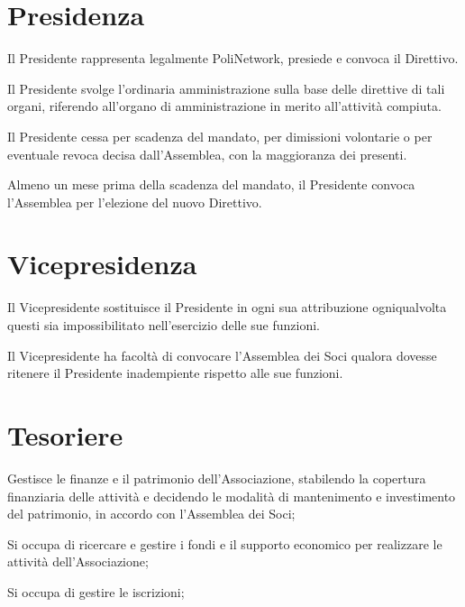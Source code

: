 \documentclass[legalpaper, 11pt]{exam}
\let\tempone\enumerate
\let\temptwo\endenumerate
\renewenvironment{enumerate}{\tempone\addtolength{\itemsep}{-0.45\baselineskip}}{\temptwo}
\begin{document}
\section{Presidenza}
\begin{enumerate}
 \item Il Presidente rappresenta legalmente PoliNetwork, presiede e convoca il Direttivo.
 \item Il Presidente svolge l’ordinaria amministrazione sulla base delle direttive di tali organi, riferendo all’organo di amministrazione in merito all’attività compiuta.
 \item Il Presidente cessa per scadenza del mandato, per dimissioni volontarie o per eventuale revoca decisa dall’Assemblea, con la maggioranza dei presenti.
 \item Almeno un mese prima della scadenza del mandato, il Presidente convoca l’Assemblea per l’elezione del nuovo Direttivo.
\end{enumerate}

\section{Vicepresidenza}
\begin{enumerate}
 \item Il Vicepresidente sostituisce il Presidente in ogni sua attribuzione ogniqualvolta questi sia impossibilitato nell’esercizio delle sue funzioni.
 \item Il Vicepresidente ha facoltà di convocare l’Assemblea dei Soci qualora dovesse ritenere il Presidente inadempiente rispetto alle sue funzioni.
\end{enumerate}

\section{Tesoriere}
\begin{enumerate}
	\item Gestisce le finanze e il patrimonio dell’Associazione, stabilendo la copertura finanziaria delle attività e decidendo le modalità di mantenimento e investimento del patrimonio, in accordo con l’Assemblea dei Soci;
	\item Si occupa di ricercare e gestire i fondi e il supporto economico per realizzare le attività dell’Associazione;
	\item Si occupa di gestire le iscrizioni;
\end{enumerate}
\end{document}

